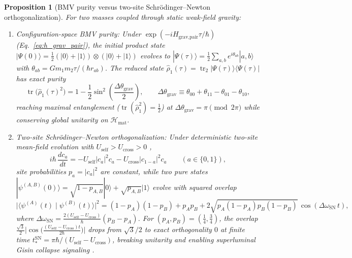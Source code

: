 \documentclass[aps,prd,onecolumn,tightenlines,nofootinbib,notitlepage,10pt,floatfix]{revtex4-2}
\theoremstyle{indentedtheorem}
\newtheorem{proposition}{Proposition}
\begin{document}
\begin{proposition}[BMV purity versus two-site Schr\"odinger--Newton orthogonalization]\label{prop:config_space_gravity}
For two masses coupled through static weak-field gravity:
\begin{enumerate}[label=(\roman*)]
\item \emph{Configuration-space BMV purity:} Under $\exp(-iH_\text{grav,pair}\tau/\hbar)$ (Eq.~\eqref{eq:h_grav_pair}), the initial product state $|\Psi(0)\rangle=\tfrac{1}{2}(|0\rangle+|1\rangle)\otimes(|0\rangle+|1\rangle)$ evolves to $|\Psi(\tau)\rangle=\tfrac{1}{2}\sum_{a,b}e^{i\theta_{ab}}|a,b\rangle$ with $\theta_{ab}=Gm_1 m_2\tau/(\hbar r_{ab})$. The reduced state $\hat{\rho}_1(\tau)=\operatorname{tr}_2|\Psi(\tau)\rangle\langle\Psi(\tau)|$ has exact purity
\begin{equation}
    \operatorname{tr}\big(\hat{\rho}_1(\tau)^2\big) = 1 - \frac{1}{2}\sin^2\!\left(\frac{\Delta\theta_\text{grav}}{2}\right), \qquad \Delta\theta_\text{grav} \equiv \theta_{00}+\theta_{11}-\theta_{01}-\theta_{10} ,
    \label{eq:gie_phase}
\end{equation}
reaching maximal entanglement ($\operatorname{tr}(\hat{\rho}_1^2)=\tfrac{1}{2}$) at $\Delta\theta_\text{grav}=\pi\pmod{2\pi}$ while conserving global unitarity on $\mathcal{H}_\text{mat}$.
\item \emph{Two-site Schr\"odinger--Newton orthogonalization:} Under deterministic two-site mean-field evolution with $U_\text{self}>U_\text{cross}>0$ \citep{Bahrami2014},
\begin{equation}
    i\hbar\,\frac{dc_a}{dt} = -U_\text{self}|c_a|^2 c_a - U_\text{cross}|c_{1-a}|^2 c_a \qquad (a\in\{0,1\}) ,
    \label{eq:sn_mean_field}
\end{equation}
site probabilities $p_a=|c_a|^2$ are constant, while two pure states $|\psi^{(A,B)}(0)\rangle=\sqrt{1-p_{A,B}}|0\rangle+\sqrt{p_{A,B}}|1\rangle$ evolve with squared overlap
\begin{equation}
    \big|\langle\psi^{(A)}(t)\mid\psi^{(B)}(t)\rangle\big|^2 = (1-p_A)(1-p_B) + p_A p_B + 2\sqrt{p_A(1-p_A)p_B(1-p_B)}\,\cos(\Delta\omega_\text{SN}\,t) ,
    \label{eq:sn_overlap_drift}
\end{equation}
where $\Delta\omega_\text{SN}=\frac{2(U_\text{self}-U_\text{cross})}{\hbar}(p_B-p_A)$. For $(p_A,p_B)=(\tfrac{1}{4},\tfrac{3}{4})$, the overlap $\tfrac{\sqrt{3}}{2}\big|\cos\big(\frac{(U_\text{self}-U_\text{cross})t}{2\hbar}\big)\big|$ drops from $\sqrt{3}/2$ to exact orthogonality $0$ at finite time $t_*^\text{SN}=\pi\hbar/(U_\text{self}-U_\text{cross})$, breaking unitarity and enabling superluminal Gisin collapse signaling \citep{Gisin1990,Bahrami2014}.
\end{enumerate}
\end{proposition}
\end{document}
